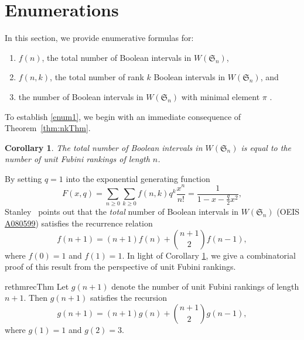 \documentclass[11pt,reqno]{amsart}
\newtheorem{corollary}{Corollary}[section]
\theoremstyle{definition}
\theoremstyle{notation}
\theoremstyle{openproblem}
\newcommand{\Sym}{\mathfrak{S}}
\begin{document}
\section{Enumerations}
\label{sec: enumerations}

In this section, we provide enumerative formulas for:
\begin{enumerate}
    \item $f(n)$, the total number of Boolean intervals in $W(\Sym_n)$, \label{enum1}
    \item $f(n,k)$, the total number  of rank $k$ Boolean intervals in $W(\Sym_n)$,\label{enum2} and 
    \item the number of Boolean intervals in $W(\Sym_n)$ with minimal element $\pi$ \label{enum3}.
\end{enumerate}


To establish \eqref{enum1}, we begin with an immediate consequence of Theorem~\ref{thm:nkThm}.


\begin{corollary}\label{cor:ofmain}
    The total number of Boolean intervals in $W(\Sym_n)$ is equal to the number of unit Fubini rankings of length $n$.
\end{corollary}

By setting $q=1$ into the exponential generating function \cite[Exercise~3.185(h)]{StanleyECVol1}
\begin{equation}
    F(x,q) 
    = \sum_{n\geq 0} \sum_{k\geq 0} f(n,k)q^k\frac{x^n}{n!} 
    = \frac{1}{1-x-\frac{q}{2}x^2}
    \label{eq:gen_fun},
\end{equation}
Stanley~\cite{StanleyMath} points out that the \emph{total} number of Boolean intervals in $W(\Sym_n)$ (OEIS \href{https://oeis.org/A080599}{A080599}) satisfies the recurrence relation  
\begin{equation}
    \label{eq: rec}
    f(n+1) = (n+1)f(n)+\binom{n+1}{2}f(n-1),
\end{equation}
where $f(0)=1$ and $f(1)=1$. 
In light of Corollary \ref{cor:ofmain}, we give a combinatorial proof of this result from the perspective of unit Fubini rankings.

\begin{restatable}{rethm}{recThm}
\label{thm: rec}
Let $g(n+1)$ denote the  number of unit Fubini rankings of length $n+1$. Then $g(n+1)$ satisfies the recursion
\[g(n+1)=(n+1)g(n)+\binom{n+1}{2}g(n-1),\]
where $g(1)=1$ and $g(2)=3$.
\end{restatable}
\end{document}
